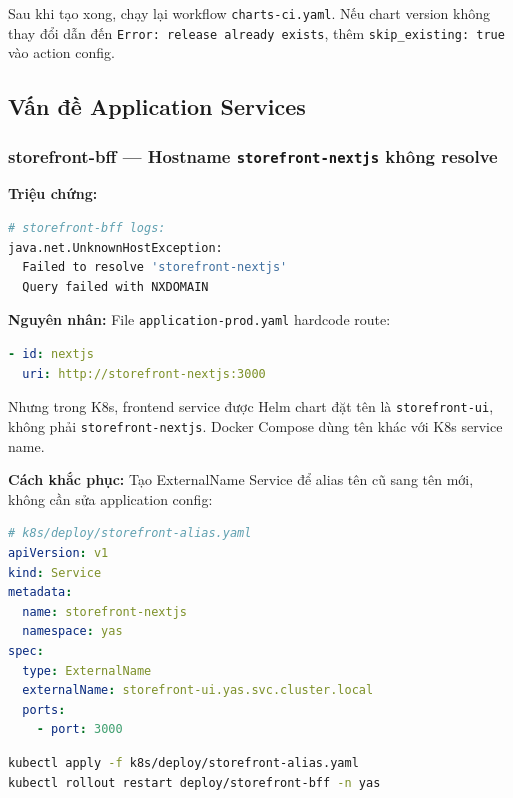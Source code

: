 Sau khi tạo xong, chạy lại workflow \texttt{charts-ci.yaml}. Nếu chart version không thay đổi dẫn đến \texttt{Error: release already exists}, thêm \texttt{skip\_existing: true} vào action config.

\subsection{Vấn đề Application Services}

\subsubsection{storefront-bff — Hostname \texttt{storefront-nextjs} không resolve}

\textbf{Triệu chứng:}

\begin{lstlisting}[language=bash]
# storefront-bff logs:
java.net.UnknownHostException:
  Failed to resolve 'storefront-nextjs'
  Query failed with NXDOMAIN
\end{lstlisting}

\textbf{Nguyên nhân:} File \texttt{application-prod.yaml} hardcode route:

\begin{lstlisting}[language=yaml]
- id: nextjs
  uri: http://storefront-nextjs:3000
\end{lstlisting}

Nhưng trong K8s, frontend service được Helm chart đặt tên là \texttt{storefront-ui}, không phải \texttt{storefront-nextjs}. Docker Compose dùng tên khác với K8s service name.

\textbf{Cách khắc phục:} Tạo ExternalName Service để alias tên cũ sang tên mới, không cần sửa application config:

\begin{lstlisting}[language=yaml]
# k8s/deploy/storefront-alias.yaml
apiVersion: v1
kind: Service
metadata:
  name: storefront-nextjs
  namespace: yas
spec:
  type: ExternalName
  externalName: storefront-ui.yas.svc.cluster.local
  ports:
    - port: 3000
\end{lstlisting}

\begin{lstlisting}[language=bash]
kubectl apply -f k8s/deploy/storefront-alias.yaml
kubectl rollout restart deploy/storefront-bff -n yas
\end{lstlisting}

